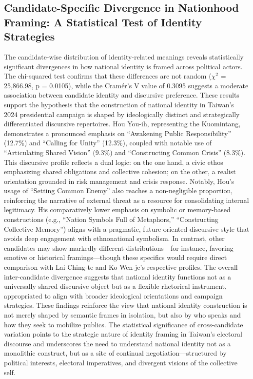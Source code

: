 \documentclass[man,12pt]{apa7}
\begin{document}
\subsection{Candidate-Specific Divergence in Nationhood Framing: A Statistical Test of Identity Strategies}

The candidate-wise distribution of identity-related meanings reveals statistically significant divergences in how national identity is framed across political actors. The chi-squared test confirms that these differences are not random ($\chi^2$ = 25,866.98, p = 0.0105), while the Cramér's V value of 0.3095 suggests a moderate association between candidate identity and discursive preference. These results support the hypothesis that the construction of national identity in Taiwan's 2024 presidential campaign is shaped by ideologically distinct and strategically differentiated discursive repertoires. 
Hou You-ih, representing the Kuomintang, demonstrates a pronounced emphasis on ``Awakening Public Responsibility'' (12.7\%) and ``Calling for Unity'' (12.3\%), coupled with notable use of ``Articulating Shared Vision'' (9.3\%) and ``Constructing Common Crisis'' (8.3\%). This discursive profile reflects a dual logic: on the one hand, a civic ethos emphasizing shared obligations and collective cohesion; on the other, a realist orientation grounded in risk management and crisis response. Notably, Hou's usage of ``Setting Common Enemy'' also reaches a non-negligible proportion, reinforcing the narrative of external threat as a resource for consolidating internal legitimacy. His comparatively lower emphasis on symbolic or memory-based constructions (e.g., ``Nation Symbols Full of Metaphors,'' ``Constructing Collective Memory'') aligns with a pragmatic, future-oriented discursive style that avoids deep engagement with ethnonational symbolism. 
In contrast, other candidates may show markedly different distributions—for instance, favoring emotive or historical framings—though these specifics would require direct comparison with Lai Ching-te and Ko Wen-je's respective profiles. The overall inter-candidate divergence suggests that national identity functions not as a universally shared discursive object but as a flexible rhetorical instrument, appropriated to align with broader ideological orientations and campaign strategies. 
These findings reinforce the view that national identity construction is not merely shaped by semantic frames in isolation, but also by who speaks and how they seek to mobilize publics. The statistical significance of cross-candidate variation points to the strategic nature of identity framing in Taiwan's electoral discourse and underscores the need to understand national identity not as a monolithic construct, but as a site of continual negotiation—structured by political interests, electoral imperatives, and divergent visions of the collective self.
\end{document}

